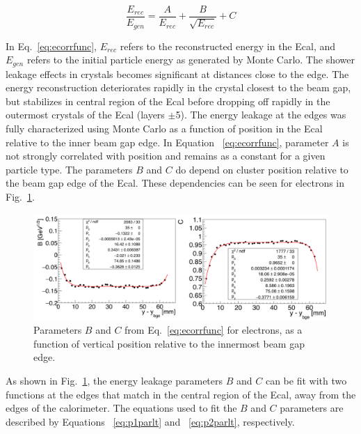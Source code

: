 \documentclass[12pt]{report}
\begin{document}
\begin{equation}
	\label{eq:ecorrfunc}
	\dfrac{E_{rec}}{E_{gen}} = \dfrac{A}{E_{rec}}+\dfrac{B}{\sqrt{E_{rec}}}+C 
\end{equation}

In Eq.~\eqref{eq:ecorrfunc}, $E_{rec}$ refers to the reconstructed energy in the Ecal, and $E_{gen}$ refers to the initial particle energy as generated by Monte Carlo. The shower leakage effects in crystals becomes significant at distances close to the edge. The energy reconstruction deteriorates rapidly in the crystal closest to the beam gap, but stabilizes in central region of the Ecal before dropping off rapidly in the outermost crystals of the Ecal (layers $\pm$5). The energy leakage at the edges was fully characterized using Monte Carlo as a function of position in the Ecal relative to the inner beam gap edge. In Equation ~\eqref{eq:ecorrfunc}, parameter $A$ is not strongly correlated with position and remains as a constant for a given particle type. The parameters $B$ and $C$  do depend on cluster position relative to the beam gap edge of the Ecal. These dependencies can be seen for electrons in Fig.~\ref{Figure:sfparEdge}.

\begin{figure}[H]
  \centering
      \includegraphics[width=1.0\textwidth]{pics/performance/sfparEdgeFit.png}
  \caption[Ecal energy shower parameters for electrons relative to the inside beam gap edge]{Parameters $B$ and $C$ from Eq.~\ref{eq:ecorrfunc} for electrons, as a function of vertical position
relative to the innermost beam gap edge.}
  \label{Figure:sfparEdge}
\end{figure}

As shown in Fig.~\ref{Figure:sfparEdge}, the energy leakage parameters $B$ and $C$ can be fit with two functions at the edges that match in the central region of the Ecal, away from the edges of the calorimeter. The equations used to fit the $B$ and $C$ parameters are described by Equations ~\eqref{eq:p1parlt} and ~\eqref{eq:p2parlt}, respectively.
\end{document}
